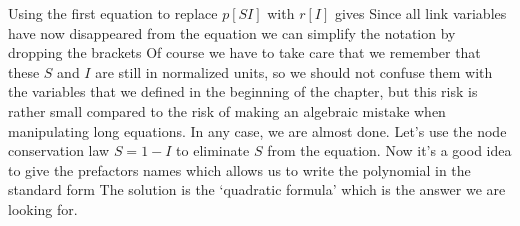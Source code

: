 Using the first equation to replace $p[SI]$ with $r[I]$ gives
Since all link variables have now disappeared from the equation we can simplify the notation by dropping the brackets
Of course we have to take care that we remember that these $S$ and $I$ are still in normalized units, so we should not confuse them with the variables that we defined in the beginning of the chapter, but this risk is rather small compared to the risk of making an algebraic mistake when manipulating long equations. In any case, we are almost done. Let's use the node conservation law $S=1-I$ to eliminate $S$ from the equation. 
Now it's a good idea to give the prefactors names
which allows us to write the polynomial in the standard form 
The solution is the `quadratic formula'
which is the answer we are looking for. 